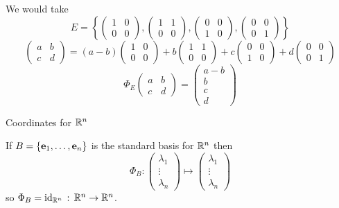 \documentclass[10pt, a4paper]{article}
\begin{document}
\begin{example}
    We would take
    \[
    E = \left\{\begin{pmatrix}
        1 & 0 \\ 0 & 0
    \end{pmatrix}, \begin{pmatrix}
        1 & 1 \\ 0 & 0
    \end{pmatrix}, \begin{pmatrix}
        0 & 0 \\ 1 & 0
    \end{pmatrix}, \begin{pmatrix}
        0 & 0 \\ 0 & 1
    \end{pmatrix}\right\}
    \]
    \[
    \begin{pmatrix}
        a & b \\ c & d
    \end{pmatrix}
    =
    (a - b)\begin{pmatrix}
        1 & 0 \\ 0 & 0
    \end{pmatrix}
    +
    b\begin{pmatrix}
        1 & 1 \\ 0 & 0
    \end{pmatrix}
    +
    c\begin{pmatrix}
        0 & 0 \\ 1 & 0
    \end{pmatrix}
    +
    d\begin{pmatrix}
        0 & 0 \\ 0 & 1
    \end{pmatrix}
    \]
    \[
    \Phi_E\begin{pmatrix}
        a & b \\ c & d
    \end{pmatrix}
    =
    \begin{pmatrix}
        a - b \\ b \\ c \\ d
    \end{pmatrix}
    \]
\end{example}

Coordinates for $\mathbb{R} ^ n$

If $B = \{\mathbf{e}_1, \dotsc, \mathbf{e}_n\}$ is the standard basis for $\mathbb{R} ^ n$ then
\[
\Phi_B : \begin{pmatrix}
    \lambda_1 \\ \vdots \\ \lambda_n
\end{pmatrix}
\mapsto
\begin{pmatrix}
    \lambda_1 \\ \vdots \\ \lambda_n
\end{pmatrix}
\]
so $\Phi_B = \mathrm{id}_{\mathbb{R} ^ n}\,:\, \mathbb{R} ^ n \rightarrow \mathbb{R} ^ n$.
\end{document}
